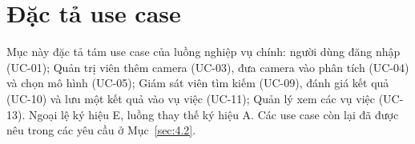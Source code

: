 \section{Đặc tả use case}
\label{sec:4.5}

Mục này đặc tả tám use case của luồng nghiệp vụ chính: người dùng đăng nhập (UC-01); Quản trị viên thêm camera (UC-03), đưa camera vào phân tích (UC-04) và chọn mô hình (UC-05); Giám sát viên tìm kiếm (UC-09), đánh giá kết quả (UC-10) và lưu một kết quả vào vụ việc (UC-11); Quản lý xem các vụ việc (UC-13). Ngoại lệ ký hiệu E, luồng thay thế ký hiệu A. Các use case còn lại đã được nêu trong các yêu cầu ở Mục~\ref{sec:4.2}.

